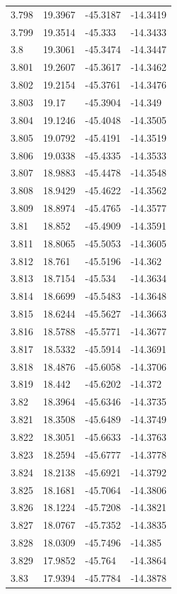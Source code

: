 \begin{tabular}{llll}
3.798 & 19.3967 & -45.3187 & -14.3419 \\
3.799 & 19.3514 & -45.333 & -14.3433 \\
3.8 & 19.3061 & -45.3474 & -14.3447 \\
3.801 & 19.2607 & -45.3617 & -14.3462 \\
3.802 & 19.2154 & -45.3761 & -14.3476 \\
3.803 & 19.17 & -45.3904 & -14.349 \\
3.804 & 19.1246 & -45.4048 & -14.3505 \\
3.805 & 19.0792 & -45.4191 & -14.3519 \\
3.806 & 19.0338 & -45.4335 & -14.3533 \\
3.807 & 18.9883 & -45.4478 & -14.3548 \\
3.808 & 18.9429 & -45.4622 & -14.3562 \\
3.809 & 18.8974 & -45.4765 & -14.3577 \\
3.81 & 18.852 & -45.4909 & -14.3591 \\
3.811 & 18.8065 & -45.5053 & -14.3605 \\
3.812 & 18.761 & -45.5196 & -14.362 \\
3.813 & 18.7154 & -45.534 & -14.3634 \\
3.814 & 18.6699 & -45.5483 & -14.3648 \\
3.815 & 18.6244 & -45.5627 & -14.3663 \\
3.816 & 18.5788 & -45.5771 & -14.3677 \\
3.817 & 18.5332 & -45.5914 & -14.3691 \\
3.818 & 18.4876 & -45.6058 & -14.3706 \\
3.819 & 18.442 & -45.6202 & -14.372 \\
3.82 & 18.3964 & -45.6346 & -14.3735 \\
3.821 & 18.3508 & -45.6489 & -14.3749 \\
3.822 & 18.3051 & -45.6633 & -14.3763 \\
3.823 & 18.2594 & -45.6777 & -14.3778 \\
3.824 & 18.2138 & -45.6921 & -14.3792 \\
3.825 & 18.1681 & -45.7064 & -14.3806 \\
3.826 & 18.1224 & -45.7208 & -14.3821 \\
3.827 & 18.0767 & -45.7352 & -14.3835 \\
3.828 & 18.0309 & -45.7496 & -14.385 \\
3.829 & 17.9852 & -45.764 & -14.3864 \\
3.83 & 17.9394 & -45.7784 & -14.3878 \\

\end{tabular}
